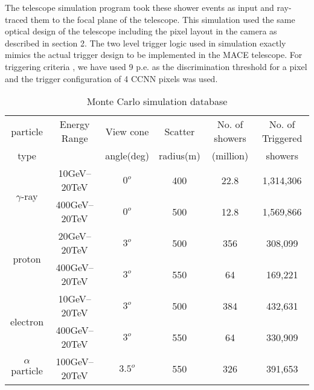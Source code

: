 \documentclass[preprint,12pt]{elsarticle}
\begin{document}
The telescope simulation program took these shower events as input and ray-traced them to the focal plane of the telescope.
This simulation used the same optical design of the telescope including the pixel layout in the camera as described in section 2.
The two level trigger logic used in simulation exactly mimics the actual trigger design to be implemented in the MACE telescope. 
For triggering criteria \cite{chinmayB}, we have used 9 p.e. as the discrimination threshold for a pixel and the trigger configuration of 4 CCNN pixels was used. 


\noindent
\begin{table}[htbp]
	\renewcommand{\arraystretch}{0.6}
	\begin{center}
	\begin{tabular}{|c|c|c|c|c|c|}
		\hline
		particle & Energy Range &  View cone & Scatter    & No. of showers & No. of Triggered  \\
		type     &              &  angle(deg) & radius(m) &  (million)     & showers \\
		\hline
		\multirow{2}{*}{$\gamma$-ray}
			& 10GeV--20TeV &  $0^o$ & 400 & 22.8 & 1,314,306 \\
		             & 400GeV--20TeV &  $0^o$ & 500 & 12.8  & 1,569,866\\
		\hline
		\multirow{2}{*}{proton}
		    & 20GeV--20TeV &  $3^o$ & 500 & 356 & 308,099 \\
		             & 400GeV--20TeV & $3^o$ & 550 & 64 & 169,221\\
		\hline
		\multirow{2}{*}{electron}
		    & 10GeV--20TeV &  $3^o$ & 500 & 384 & 432,631 \\
		             & 400GeV--20TeV & $3^o$ & 550 & 64 & 330,909\\
		\hline
		    $\alpha$ particle & 100GeV--20TeV &  $3.5^o$ & 550 & 326 & 391,653 \\
		\hline
	\end{tabular}
	\end{center}
	\caption{Monte Carlo simulation database}
	\label{Table:database}
\end{table}
\end{document}
